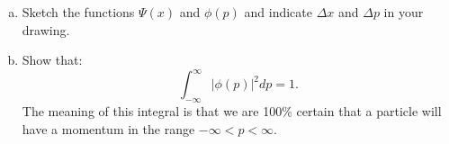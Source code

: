 \begin{enumerate}
\begin{enumerate}[a)]
\item Sketch the functions $\Psi(x)$ and $\phi(p)$ and indicate $\Delta x$ and $\Delta p$ in your drawing. 

\item Show that:
$$\int_{-\infty}^{\infty} |\phi(p)|^{2}dp=1.$$
The meaning of this integral is that we are 100\% certain that a particle will have a momentum in the range $-\infty<p<\infty$.

\end{enumerate}



\end{enumerate}
